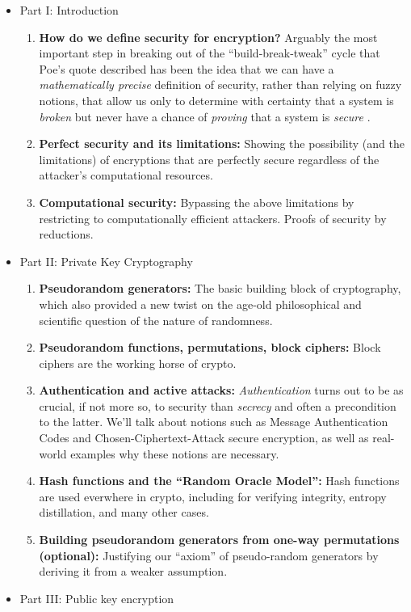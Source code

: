 \begin{itemize}
\item
  Part I: Introduction

  \begin{enumerate}
  \def\labelenumi{\arabic{enumi}.}
  \item
    \textbf{How do we define security for encryption?} Arguably the most
    important step in breaking out of the ``build-break-tweak'' cycle
    that Poe's quote described has been the idea that we can have a
    \emph{mathematically precise} definition of security, rather than
    relying on fuzzy notions, that allow us only to determine with
    certainty that a system is \emph{broken} but never have a chance of
    \emph{proving} that a system is \emph{secure} .
  \item
    \textbf{Perfect security and its limitations:} Showing the
    possibility (and the limitations) of encryptions that are perfectly
    secure regardless of the attacker's computational resources.
  \item
    \textbf{Computational security:} Bypassing the above limitations by
    restricting to computationally efficient attackers. Proofs of
    security by reductions.
  \end{enumerate}
\item
  Part II: Private Key Cryptography

  \begin{enumerate}
  \def\labelenumi{\arabic{enumi}.}
  \item
    \textbf{Pseudorandom generators:} The basic building block of
    cryptography, which also provided a new twist on the age-old
    philosophical and scientific question of the nature of randomness.
  \item
    \textbf{Pseudorandom functions, permutations, block ciphers:} Block
    ciphers are the working horse of crypto.
  \item
    \textbf{Authentication and active attacks:} \emph{Authentication}
    turns out to be as crucial, if not more so, to security than
    \emph{secrecy} and often a precondition to the latter. We'll talk
    about notions such as Message Authentication Codes and
    Chosen-Ciphertext-Attack secure encryption, as well as real-world
    examples why these notions are necessary.
  \item
    \textbf{Hash functions and the ``Random Oracle Model'':} Hash
    functions are used everwhere in crypto, including for verifying
    integrity, entropy distillation, and many other cases.
  \item
    \textbf{Building pseudorandom generators from one-way permutations
    (optional):} Justifying our ``axiom'' of pseudo-random generators by
    deriving it from a weaker assumption.
  \end{enumerate}
\item
  Part III: Public key encryption


\end{itemize}

